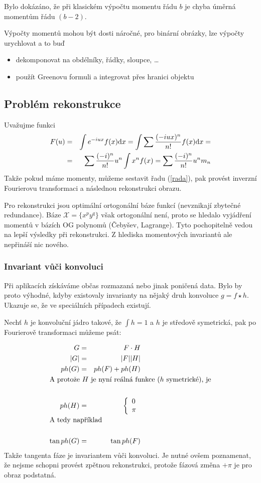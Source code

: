 Bylo dokázáno, že při klasickém výpočtu momentu řádu $b$ je chyba úměrná momentům řádu $(b-2)$. 

Výpočty momentů mohou být dosti náročné, pro binární obrázky, lze výpočty urychlovat a to buď
\begin{itemize}
\item dekomponovat na obdélníky, řádky, sloupce, \dots
\item použít Greenovu formuli a integrovat přes hranici objektu
\end{itemize}

\subsection{Problém rekonstrukce}

Uvažujme funkci
\begin{eqnarray}
F(u)&=&\int e^{-iux}f(x){\rm d} x=\int\sum\frac{(-iux)^n}{n!}f(x){\rm d} x=\nonumber\\
&=&\sum\frac{(-i)^n}{n!}u^n\int x^nf(x)=\sum\frac{(-i)^n}{n!}u^n m_n\label{rada}
\end{eqnarray}
\noindent Takže pokud máme momenty, můžeme sestavit řadu (\ref{rada}), pak provést inverzní Fourierovu 
transformaci a následnou rekonstrukci obrazu.

Pro rekonstrukci jsou optimální ortogonální báze funkcí (nevznikají zbytečné redundance).
Báze $\mathcal{X}=\{x^py^q\}$ však ortogonální není, proto se hledalo vyjádření momentů
v bázích OG polynomů (Čebyšev, Lagrange). Tyto pochopitelně vedou na lepší výsledky při rekonstrukci.
Z hlediska momentových invariantů ale nepřináší nic nového.

\subsubsection{Invariant vůči konvoluci}
Při aplikacích získáváme občas rozmazaná nebo jinak poničená data. Bylo by proto výhodné, kdyby
existovaly invarianty na nějaký druh konvoluce $g=f\star h$. Ukazuje se, že ve speciálních případech
existují. 

Nechť $h$ je konvoluční jádro takové, že $\int h=1$ a $h$ je středově symetrická, pak po Fourierově 
transformaci můžeme psát:

\begin{eqnarray}
G&=&F\cdot H\\
|G|&=&|F||H|\\
ph(G)&=&ph(F)+ph(H)\\
\noalign{\hbox{A protože $H$ je nyní reálná funkce ($h$ symetrické), je}\nonumber}\\
ph(H)&=&\left\{\begin{array}{ll}0\\\pi\end{array}\right.\\
\noalign{\hbox{A tedy například}\nonumber}\\
\tan ph(G)&=&\tan ph(F)
\end{eqnarray}
\noindent Takže tangenta fáze je invariantem vůči konvoluci. Je nutné ovšem poznamenat, že 
nejsme schopni provést zpětnou rekonstrukci, protože fázová změna $+\pi$ je pro obraz podstatná.

